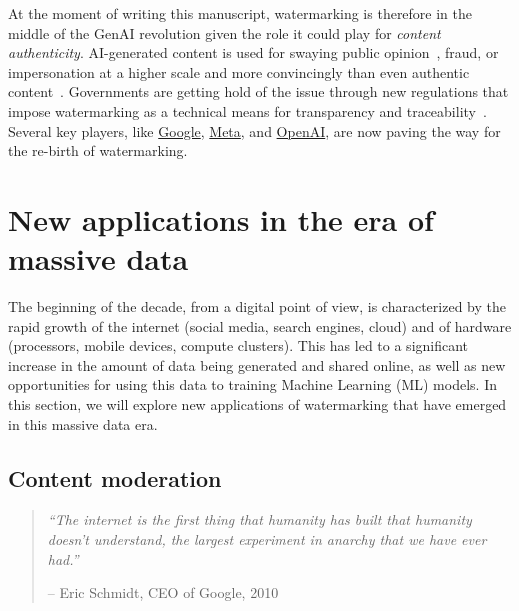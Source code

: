 At the moment of writing this manuscript, watermarking is therefore in the middle of the GenAI revolution given the role it could play for \emph{content authenticity}.
AI-generated content is used for swaying public opinion~\citep{shen2019fake, goldstein2023generative}, fraud, or impersonation at a higher scale and more convincingly than even authentic content~\citep{spitale2023ai}.
Governments are getting hold of the issue through new regulations that impose watermarking as a technical means for transparency and traceability~\citep{USAIAnnouncement, ChineseAIGovernance, EuropeanAIAct, ca_ab3211_2024}.
Several key players, like
\href{https://deepmind.google/discover/blog/watermarking-ai-generated-text-and-video-with-synthid/}{Google}, 
\href{https://about.fb.com/news/2024/04/metas-approach-to-labeling-ai-generated-content-and-manipulated-media/}{Meta},
and
\href{https://openai.com/index/understanding-the-source-of-what-we-see-and-hear-online/}{OpenAI},
are now paving the way for the re-birth of watermarking.















\section{New applications in the era of massive data}

The beginning of the decade, from a digital point of view, is characterized by the rapid growth of the internet (social media, search engines, cloud) and of hardware (processors, mobile devices, compute clusters).
This has led to a significant increase in the amount of data being generated and shared online, as well as new opportunities for using this data to training Machine Learning (ML) models.
In this section, we will explore new applications of watermarking that have emerged in this massive data era.


\subsection*{Content moderation}

\begin{quote}
    \textit{``The internet is the first thing that humanity has built that humanity doesn't understand, the largest experiment in anarchy that we have ever had.''}
    \begin{flushright} -- Eric Schmidt, CEO of Google, 2010 \end{flushright}
\end{quote}


